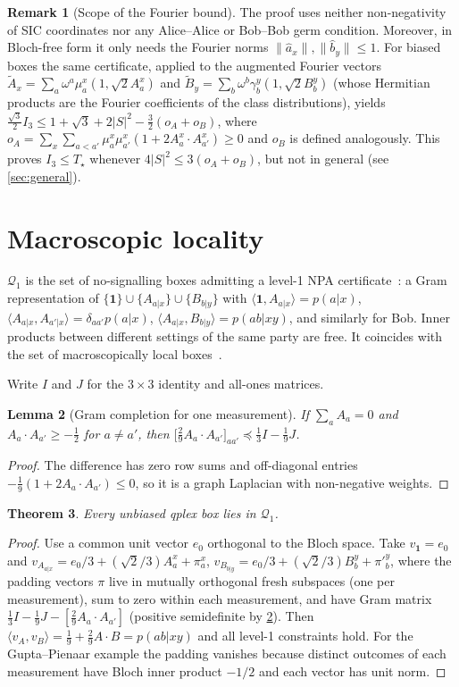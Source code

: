\documentclass[11pt]{article}
\newtheorem{theorem}{Theorem}
\newtheorem{lemma}[theorem]{Lemma}
\theoremstyle{definition}
\newtheorem{remark}[theorem]{Remark}
\newcommand{\Tq}{T_{\star}}
\newcommand{\qone}{\mathcal{Q}_1}
\begin{document}
\begin{remark}[Scope of the Fourier bound]
The proof uses neither non-negativity of SIC coordinates nor any Alice--Alice or Bob--Bob germ condition.
Moreover, in Bloch-free form it only needs the Fourier norms $\|\hat a_x\|,\|\hat b_y\|\le1$. For biased boxes
the same certificate, applied to the augmented Fourier vectors $\tilde A_x=\sum_a\omega^a\mu^x_a(1,\sqrt2A^x_a)$ and $\tilde B_y=\sum_b\omega^b\gamma^y_b(1,\sqrt2B^y_b)$ (whose Hermitian products are the Fourier coefficients of the class distributions), yields $\tfrac{\sqrt3}{2}I_3\le1+\sqrt3+2|S|^2-\tfrac32(o_A+o_B)$, where
$o_A=\sum_x\sum_{a<a'}\mu^x_a\mu^x_{a'}(1+2A^x_a\cdot A^x_{a'})\ge0$ and $o_B$ is defined analogously.
This proves $I_3\le\Tq$ whenever $4|S|^2\le3(o_A+o_B)$, but not in general (see \cref{sec:general}).
\end{remark}

\section{Macroscopic locality}

$\qone$ is the set of no-signalling boxes admitting a level-1 NPA certificate~\cite{NPA2007,NPA2008}: a Gram
representation of $\{\mathbf{1}\}\cup\{A_{a|x}\}\cup\{B_{b|y}\}$ with
$\langle\mathbf{1},A_{a|x}\rangle=p(a|x)$, $\langle A_{a|x},A_{a'|x}\rangle=\delta_{aa'}p(a|x)$,
$\langle A_{a|x},B_{b|y}\rangle=p(ab|xy)$, and similarly for Bob. Inner products between different settings of the
same party are free. It coincides with the set of macroscopically local boxes~\cite{NavascuesWunderlich2010}.

Write $I$ and $J$ for the $3\times3$ identity and all-ones matrices.
\begin{lemma}[Gram completion for one measurement]\label{lem:pad}
If $\sum_aA_a=0$ and $A_a\cdot A_{a'}\ge-\tfrac12$ for $a\ne a'$, then
$\bigl[\tfrac29A_a\cdot A_{a'}\bigr]_{aa'}\preceq\tfrac13I-\tfrac19J$.
\end{lemma}
\begin{proof}
The difference has zero row sums and off-diagonal entries $-\tfrac19(1+2A_a\cdot A_{a'})\le0$, so it is a graph
Laplacian with non-negative weights.
\end{proof}

\begin{theorem}\label{thm:Q1member}
Every unbiased qplex box lies in $\qone$.
\end{theorem}
\begin{proof}
Use a common unit vector $e_0$ orthogonal to the Bloch space. Take $v_{\mathbf{1}}=e_0$ and
$v_{A_{a|x}}=e_0/3+(\sqrt2/3)A^x_a+\pi^x_a$,
$v_{B_{b|y}}=e_0/3+(\sqrt2/3)B^y_b+\pi'^y_b$, where the padding vectors $\pi$ live in mutually
orthogonal fresh subspaces (one per measurement), sum to zero within each measurement, and have Gram matrix
$\tfrac13I-\tfrac19J-[\tfrac29A_a\cdot A_{a'}]$ (positive semidefinite by \cref{lem:pad}). Then
$\langle v_A,v_B\rangle=\tfrac19+\tfrac29A\cdot B=p(ab|xy)$ and all level-1 constraints hold. For the Gupta--Pienaar example the padding vanishes because
distinct outcomes of each measurement have Bloch inner product $-1/2$ and each vector has unit norm.
\end{proof}
\end{document}
